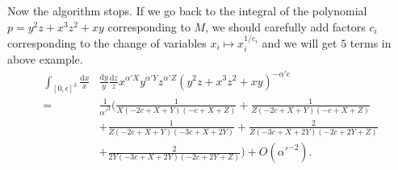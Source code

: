 \documentclass[12pt]{article}
\theoremstyle{definition}
\newtheorem{defi}[para]{Definition}
\theoremstyle{plain}
\newcommand{\dif}{\mathrm{d}} %
\begin{document}
Now the algorithm stops. If we go back to the integral of the polynomial $p=y^2z+x^3z^2+xy$
corresponding to $M$, we should carefully add factors $c_i$
corresponding to the change of variables $x_i\mapsto x_i^{1/c_i}$ and we will get $5$ terms 
in above example.
\begin{align*}
	\int_{[0,\epsilon]^3}\frac{\dif x}{x}&\frac{\dif y}{y}\frac{\dif z}{z}
	x^{\alpha' X}y^{\alpha' Y}z^{\alpha' Z}(y^2z+x^3z^2+xy)^{-\alpha' c}\\
	=\,&\frac{1}{{\alpha'}^3}\biggl(
	\frac{1}{X (-2 c+X+Y) (-c+X+Z)}+\frac{1}{Z (-2 c+X+Y) (-c+X+Z)}\\
	&+\frac{1}{Z (-2 c+X+Y) (-3 c+X+2 Y)}+
	\frac{2}{Z (-3 c+X+2 Y) (-2 c+2 Y+Z)}\\
	&+\frac{2}{2 Y (-3 c+X+2 Y) (-2 c+2 Y+Z)}
	\biggr) +O({\alpha'}^{-2}).
\end{align*}




 
\end{document}
